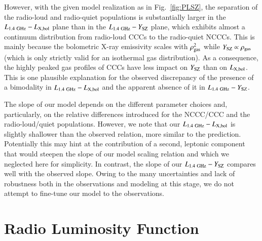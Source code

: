 \documentclass[useAMS,usenatbib]{mn2e}
\begin{document}
However, with the given model realization as in Fig.~\ref{fig:PLSZ}, the
separation of the radio-loud and radio-quiet populations is substantially larger in
the $L_{1.4~{\mathrm{GHz}}}-L_{{\mathrm{X,bol}}}$ plane than in the
$L_{1.4~{\mathrm{GHz}}}-Y_{{\mathrm{SZ}}}$ plane, which exhibits almost a continuum
distribution from radio-loud CCCs to the radio-quiet NCCCs. This is mainly
because the bolometric X-ray emissivity scales with $\rho_{{\mathrm{gas}}}^2$ while
$Y_{{\mathrm{SZ}}}\propto\rho_{{\mathrm{gas}}}$ (which is only strictly valid for an
isothermal gas distribution). As a consequence, the highly peaked gas profiles
of CCCs have less impact on $Y_{{\mathrm{SZ}}}$ than on $L_{{\mathrm{X,bol}}}$. This is
one plausible explanation for the observed discrepancy of the presence of a
bimodality in $L_{1.4~{\mathrm{GHz}}}-L_{{\mathrm{X,bol}}}$ and the apparent absence of it
in $L_{1.4~{\mathrm{GHz}}}-Y_{{\mathrm{SZ}}}$. 

The slope of our model depends on the different parameter choices and,
particularly, on the relative differences introduced for the NCCC/CCC and the
radio-loud/quiet populations. However, we note that our
$L_{1.4~{\mathrm{GHz}}}-L_{{\mathrm{X,bol}}}$ is slightly shallower than the observed
relation, more similar to the \cite{2009JCAP...09..024K} prediction.
Potentially this may hint at the contribution of a second, leptonic component
that would steepen the slope of our model scaling relation and which we
neglected here for simplicity. In contrast, the slope of our
$L_{1.4~{\mathrm{GHz}}}-Y_{{\mathrm{SZ}}}$ compares well with the observed slope. Owing to
the many uncertainties and lack of robustness both in the observations and
modeling at this stage, we do not attempt to fine-tune our model to the
observations.



\section{Radio Luminosity Function}
\label{sec:5}
\end{document}
